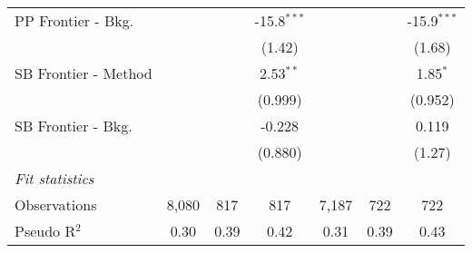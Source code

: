 \begin{tabular}{lcccccc}
   PP Frontier - Bkg.   &         &               & -15.8$^{***}$ &         &               & -15.9$^{***}$\\   
                        &         &               & (1.42)        &         &               & (1.68)\\   
   SB Frontier - Method &         &               & 2.53$^{**}$   &         &               & 1.85$^{*}$\\   
                        &         &               & (0.999)       &         &               & (0.952)\\   
   SB Frontier - Bkg.   &         &               & -0.228        &         &               & 0.119\\   
                        &         &               & (0.880)       &         &               & (1.27)\\   
   \midrule
   \emph{Fit statistics}\\
   Observations         & 8,080   & 817           & 817           & 7,187   & 722           & 722\\  
   Pseudo R$^2$         & 0.30    & 0.39          & 0.42          & 0.31    & 0.39          & 0.43\\  
   

\end{tabular}
